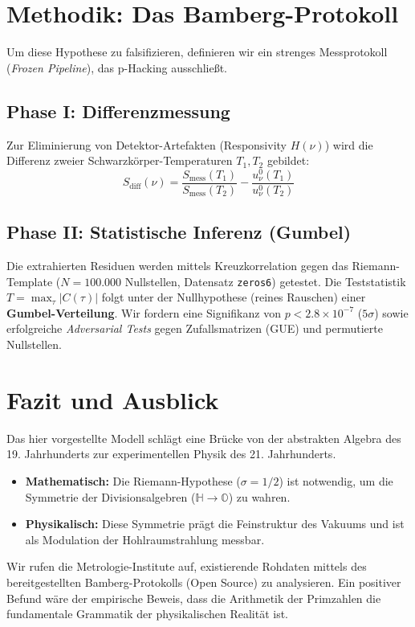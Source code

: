 \documentclass[11pt, a4paper]{article}
\begin{document}
	\section{Methodik: Das Bamberg-Protokoll}
	
	Um diese Hypothese zu falsifizieren, definieren wir ein strenges Messprotokoll (\textit{Frozen Pipeline}), das p-Hacking ausschließt.
	
	\subsection{Phase I: Differenzmessung}
	Zur Eliminierung von Detektor-Artefakten (Responsivity $H(\nu)$) wird die Differenz zweier Schwarzkörper-Temperaturen $T_1, T_2$ gebildet:
	\begin{equation}
		S_{\text{diff}}(\nu) = \frac{S_{\text{mess}}(T_1)}{S_{\text{mess}}(T_2)} - \frac{u_\nu^0(T_1)}{u_\nu^0(T_2)}
	\end{equation}
	
	\subsection{Phase II: Statistische Inferenz (Gumbel)}
	Die extrahierten Residuen werden mittels Kreuzkorrelation gegen das Riemann-Template ($N=100.000$ Nullstellen, Datensatz \texttt{zeros6}) getestet.
	Die Teststatistik $T = \max_\tau |C(\tau)|$ folgt unter der Nullhypothese (reines Rauschen) einer \textbf{Gumbel-Verteilung}.
	Wir fordern eine Signifikanz von $p < 2.8 \times 10^{-7}$ ($5\sigma$) sowie erfolgreiche \textit{Adversarial Tests} gegen Zufallsmatrizen (GUE) und permutierte Nullstellen.
	
	\section{Fazit und Ausblick}
	
	Das hier vorgestellte Modell schlägt eine Brücke von der abstrakten Algebra des 19. Jahrhunderts zur experimentellen Physik des 21. Jahrhunderts.
	\begin{itemize}
		\item \textbf{Mathematisch:} Die Riemann-Hypothese ($\sigma=1/2$) ist notwendig, um die Symmetrie der Divisionsalgebren ($\mathbb{H} \to \mathbb{O}$) zu wahren.
		\item \textbf{Physikalisch:} Diese Symmetrie prägt die Feinstruktur des Vakuums und ist als Modulation der Hohlraumstrahlung messbar.
	\end{itemize}
	Wir rufen die Metrologie-Institute auf, existierende Rohdaten mittels des bereitgestellten Bamberg-Protokolls (Open Source) zu analysieren. Ein positiver Befund wäre der empirische Beweis, dass die Arithmetik der Primzahlen die fundamentale Grammatik der physikalischen Realität ist.
	
\end{document}

